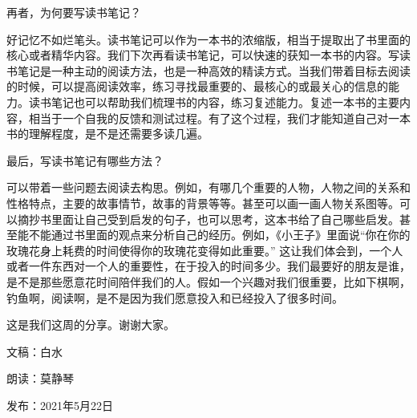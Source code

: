 再者，为何要写读书笔记？



好记忆不如烂笔头。读书笔记可以作为一本书的浓缩版，相当于提取出了书里面的核心或者精华内容。我们下次再看读书笔记，可以快速的获知一本书的内容。写读书笔记是一种主动的阅读方法，也是一种高效的精读方式。当我们带着目标去阅读的时候，可以提高阅读效率，练习寻找最重要的、最核心的或最关心的信息的能力。读书笔记也可以帮助我们梳理书的内容，练习复述能力。复述一本书的主要内容，相当于一个自我的反馈和测试过程。有了这个过程，我们才能知道自己对一本书的理解程度，是不是还需要多读几遍。



最后，写读书笔记有哪些方法？



可以带着一些问题去阅读去构思。例如，有哪几个重要的人物，人物之间的关系和性格特点，主要的故事情节，故事的背景等等。甚至可以画一画人物关系图等。可以摘抄书里面让自己受到启发的句子，也可以思考，这本书给了自己哪些启发。甚至能不能通过书里面的观点来分析自己的经历。例如，《小王子》里面说“你在你的玫瑰花身上耗费的时间使得你的玫瑰花变得如此重要。” 这让我们体会到，一个人或者一件东西对一个人的重要性，在于投入的时间多少。我们最要好的朋友是谁，是不是那些愿意花时间陪伴我们的人。假如一个兴趣对我们很重要，比如下棋啊，钓鱼啊，阅读啊，是不是因为我们愿意投入和已经投入了很多时间。






这是我们这周的分享。谢谢大家。

\vspace{10pt}

文稿：白水

朗读：莫静琴

发布：2021年5月22日







\vspace{10pt}

\hline

